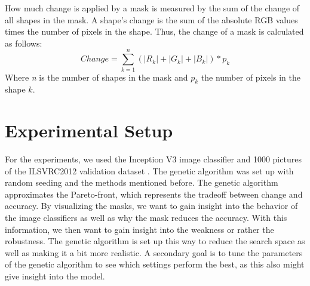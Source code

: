 \documentclass[conference]{IEEEtran}
\begin{document}
How much change is applied by a mask is measured by the sum of the change of all shapes in the mask.
A shape's change is the sum of the absolute RGB values times the number of pixels in the shape.
Thus, the change of a mask is calculated as follows:
\[
Change = \sum _{k=1}^{n}(\left |R_{k} \right|+\left |G_{k} \right|+\left |B_{k} \right|)*p_{k}
\]
Where \textit{n} is the number of shapes in the mask and $p_k$ the number of pixels in the shape $k$.

\section{Experimental Setup}

For the experiments, we used the Inception V3 image classifier \cite{inception} and 1000 pictures of the ILSVRC2012 validation dataset \cite{imagenet}.
The genetic algorithm was set up with random seeding and the methods mentioned before.
The genetic algorithm approximates the Pareto-front, which represents the tradeoff between change and accuracy.
By visualizing the masks, we want to gain insight into the behavior of the image classifiers as well as why the mask reduces the accuracy.
With this information, we then want to gain insight into the weakness or rather the robustness.
The genetic algorithm is set up this way to reduce the search space as well as making it a bit more realistic.
A secondary goal is to tune the parameters of the genetic algorithm to see which settings perform the best, as this also might give insight into the model.
\end{document}
